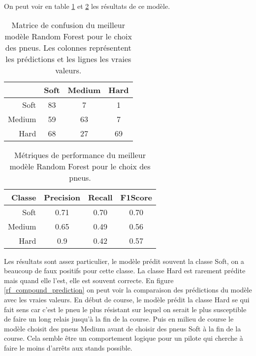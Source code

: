 On peut voir en table \ref{rf_compound_matrix} et \ref{rf_compound_results} les résultats de ce modèle.
\begin{table}[H]
    \begin{center}
        \caption{\label{rf_compound_matrix}Matrice de confusion du meilleur modèle Random Forest pour le choix des pneus.
            Les colonnes représentent les prédictions et les lignes les vraies valeurs.}
        \begin{tabular}{r|ccc}
                   & Soft & Medium & Hard \\ \hline
            Soft   & 83   & 7      & 1    \\
            Medium & 59   & 63     & 7    \\
            Hard   & 68   & 27     & 69   \\
        \end{tabular}
    \end{center}
\end{table}
\begin{table}[H]
    \begin{center}
        \caption{\label{rf_compound_results}Métriques de performance du meilleur modèle Random Forest pour le choix des pneus.}
        \begin{tabular}{r|ccc}
            Classe & Precision & Recall & F1Score \\ \hline
            Soft   & 0.71      & 0.70   & 0.70    \\
            Medium & 0.65      & 0.49   & 0.56    \\
            Hard   & 0.9       & 0.42   & 0.57    \\
        \end{tabular}
    \end{center}
\end{table}
Les résultats sont assez particulier, le modèle prédit souvent la classe Soft, on a beaucoup de faux positifs pour cette classe.
La classe Hard est rarement prédite mais quand elle l'est, elle est souvent correcte.
En figure \ref{rf_compound_prediction} on peut voir la comparaison des prédictions du modèle avec les vraies valeurs.
En début de course, le modèle prédit la classe Hard se qui fait sens car c'est le pneu le plus résistant sur lequel on serait le plus susceptible de faire un long relais jusqu'à la fin de la course.
Puis en milieu de course le modèle choisit des pneus Medium avant de choisir des pneus Soft à la fin de la course.
Cela semble être un comportement logique pour un pilote qui cherche à faire le moins d'arrêts aux stands possible.


